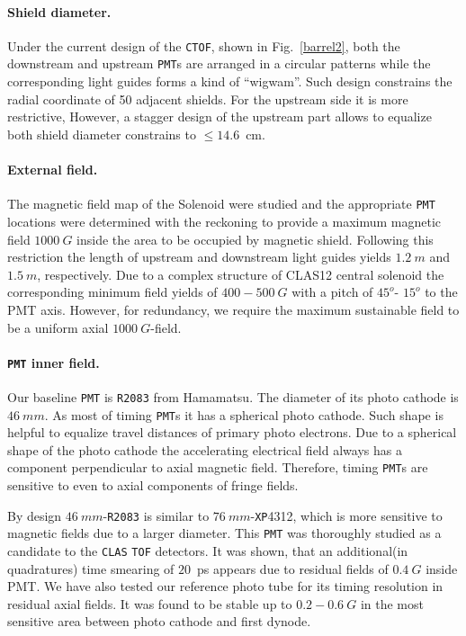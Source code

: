 \documentclass[12pt]{article}
\begin{document}
\paragraph{Shield diameter.}
Under the current design of the {\tt CTOF}, shown in Fig.~\ref{barrel2},
both the downstream and upstream {\tt PMT}s are arranged in a 
circular patterns while  the corresponding light guides forms a  kind of ``wigwam''. 
Such design constrains the radial coordinate  of 50 adjacent  shields.
For the upstream side it is more restrictive, However, a 
stagger design of the upstream part allows to equalize both  
shield diameter constrains to  $\leq14.6$~cm.
  
\paragraph{External field.}
The magnetic field map of the Solenoid were studied and  the  appropriate
{\tt PMT} locations were determined with the  reckoning to provide  a maximum  magnetic field
$1000~G$  inside the area to be  occupied by magnetic shield. 
Following this restriction 
the length of  upstream and downstream light guides yields  $1.2~m$ and $1.5~m$, respectively. 
Due to a  complex  structure of CLAS12 central solenoid  the corresponding  
minimum field   yields of $400-500~G$ with a pitch of $45^o$- $15^o$ to the PMT axis.
However,   for  redundancy, 
we require   the maximum sustainable  field to be a  uniform axial  $1000~G$-field.
\paragraph{{\tt PMT} inner field.}
Our baseline  {\tt PMT} is  {\tt R2083} from Hamamatsu.
The diameter of its  photo cathode  is $46~mm$. 
As most of timing {\tt PMT}s it has a spherical photo cathode. 
Such shape is helpful to  equalize travel  distances of primary photo electrons. 
Due to a spherical shape of the photo cathode the accelerating  
electrical field always  has  a  component perpendicular to  axial magnetic field. 
Therefore, timing {\tt PMT}s are   sensitive to even to 
axial components of fringe fields.

By design  $46~mm$-{\tt R2083} is similar to $76~mm$-{\tt XP}4312, which  is more sensitive 
to magnetic fields due to a larger diameter. This {\tt PMT}   was thoroughly studied 
as a candidate to the {\tt CLAS}  {\tt TOF} detectors\cite{r2}. 
It was shown, that an additional(in quadratures) time  smearing of $20$~ps 
appears  due to  residual  fields of $0.4~G$ inside PMT\cite{flint}. 
We have also tested our reference photo tube for its timing 
resolution  in residual axial fields.
It was found to be stable up to  $0.2-0.6~G$ in the most sensitive 
area between photo cathode and first dynode.
\end{document}
